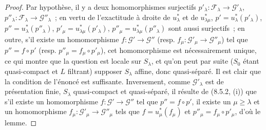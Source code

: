 \begin{proof}
Par hypothèse, il y a deux homomorphismes surjectifs
$p'_\lambda:\mathcal F_\lambda\to\mathcal G'_\lambda$,
$p''_\lambda:\mathcal F_\lambda\to\mathcal G''_\lambda$~; en vertu de
l'exactitude à droite de $u_\lambda^*$ et de $u_{\lambda\mu}^*$,
$p'=u_\lambda^*(p'_\lambda)$, $p''=u_\lambda^*(p''_\lambda)$,
$p'_\mu=u_{\lambda\mu}^*(p'_\lambda)$,
$p''_\mu=u_{\lambda\mu}^*(p''_\lambda)$ sont aussi surjectifs~; en outre, s'il
existe un homomorphisme $f:\mathcal G'\to\mathcal G''$ (resp.
$f_\mu:\mathcal G'_\mu\to\mathcal G''_\mu$) tel que $p''=f\circ p'$ (resp.
$p''_\mu=f_\mu\circ p'_\mu$), cet homomorphisme est nécessairement unique, ce
qui montre que la question est locale sur $S_\lambda$, et qu'on peut par suite
($S_0$ étant quasi-compact et $L$ filtrant) supposer $S_\lambda$ affine, donc
quasi-séparé. Il est clair que la condition de l'énoncé est suffisante.
Inversement, comme $\mathcal G'_\lambda$ est de présentation finie,
$S_\lambda$ quasi-compact et quasi-séparé, il résulte de (8.5.2, (i)) que s'il
existe un homomorphisme $f:\mathcal G'\to\mathcal G''$ tel que
$p''=f\circ p'$, il existe un $\mu\geq\lambda$ et un homomorphisme
$f_\mu:\mathcal G'_\mu\to\mathcal G''_\mu$ tels que
$f=u_\mu^*(f_\mu)$ et $p''_\mu=f_\mu\circ p'_\mu$, d'où le lemme.
\end{proof}

